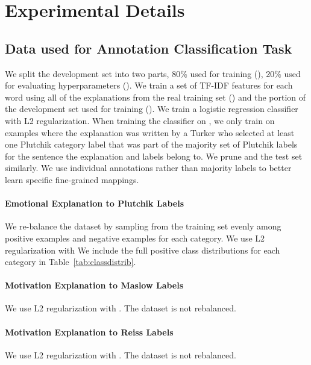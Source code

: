 \documentclass[11pt,a4paper]{article}
\begin{document}
\section{Experimental Details}
\subsection{Data used for Annotation Classification Task}

We split the development set into two parts, 80\% used for training (), 20\% used for evaluating hyperparameters (). We train a set of TF-IDF features for each word using all of the explanations from the real training set () and the portion of the development set used for training (). We train a logistic regression classifier with L2 regularization. When training the classifier on , we only train on examples where the explanation was written by a Turker who selected at least one Plutchik category label that was part of the majority set of Plutchik labels for the sentence the explanation and labels belong to. We prune  and the test set similarly. We use individual annotations rather than majority labels to better learn specific fine-grained mappings.

\paragraph{Emotional Explanation to Plutchik Labels} We re-balance the dataset by sampling from the training set evenly among positive examples and negative examples for each category. We use L2 regularization with  We include the full positive class distributions for each category in Table~\ref{tab:classdistrib}.

\paragraph{Motivation Explanation to Maslow Labels} We use L2 regularization with . The dataset is not rebalanced.

\paragraph{Motivation Explanation to Reiss Labels} We use L2 regularization with . The dataset is not rebalanced.
\end{document}
